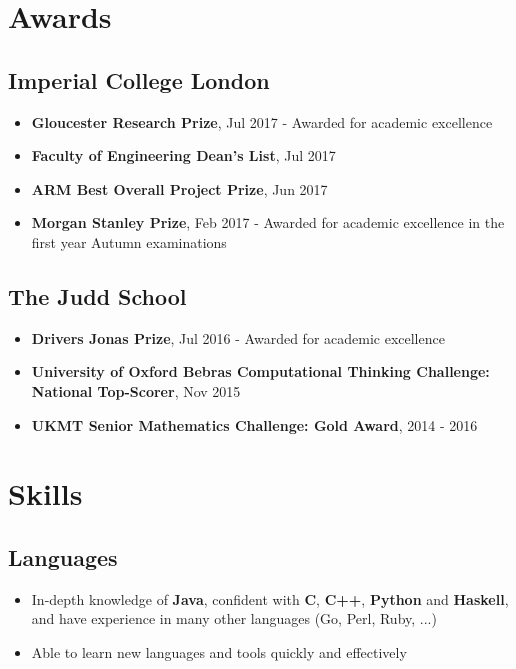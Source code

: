 \documentclass[a4paper]{article}
\begin{document}
\begin{minipage}[t]{.32\textwidth}
\section*{Awards}

\subsection*{Imperial College London}
\begin{itemize}
	\item \textbf{Gloucester Research Prize}, Jul 2017 - Awarded for academic excellence
	\item \textbf{Faculty of Engineering Dean's List}, Jul 2017
	\item \textbf{ARM Best Overall Project Prize}, Jun 2017
	\item \textbf{Morgan Stanley Prize}, Feb 2017 - Awarded for academic excellence in the first year Autumn examinations
\end{itemize}

\subsection*{The Judd School}
\begin{itemize}
\item \textbf{Drivers Jonas Prize}, Jul 2016 - Awarded for academic excellence
\item \textbf{University of Oxford Bebras Computational Thinking Challenge: National Top-Scorer}, Nov 2015
\item \textbf{UKMT Senior Mathematics Challenge: Gold Award}, 2014 - 2016
\end{itemize}


\section*{Skills}

\subsection*{Languages}
\begin{itemize}
\item In-depth knowledge of \textbf{Java}, confident with \textbf{C}, \textbf{C++}, \textbf{Python} and \textbf{Haskell}, and have experience in many other languages (Go, Perl, Ruby, ...)
\item Able to learn new languages and tools quickly and effectively
\end{itemize}


\end{minipage}
\end{document}
